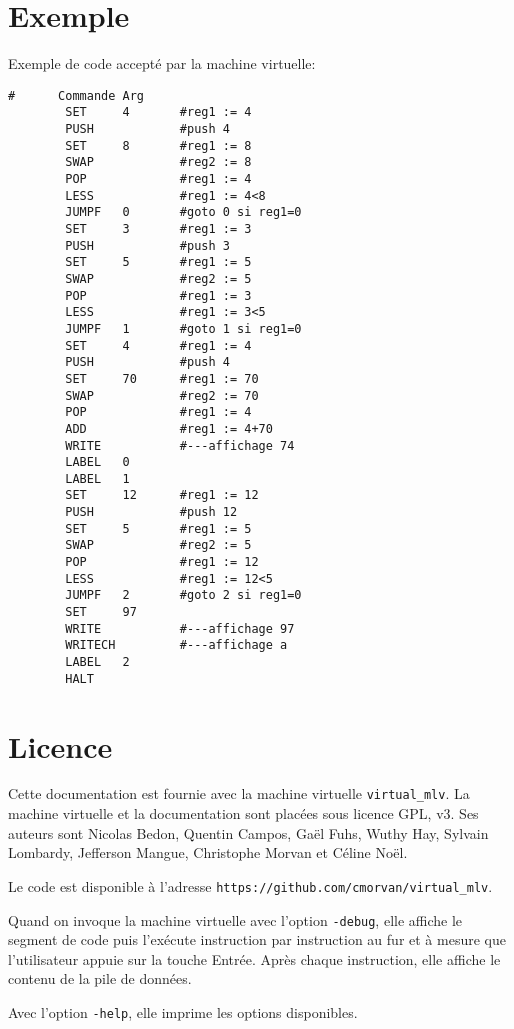 \documentclass[12pt,a4paper]{article}
\begin{document}
\section{Exemple}
Exemple de code accepté par la machine virtuelle:
\begin{verbatim}
#      Commande Arg
        SET     4       #reg1 := 4
        PUSH            #push 4
        SET     8       #reg1 := 8
        SWAP            #reg2 := 8
        POP             #reg1 := 4
        LESS            #reg1 := 4<8
        JUMPF   0       #goto 0 si reg1=0
        SET     3       #reg1 := 3
        PUSH            #push 3
        SET     5       #reg1 := 5
        SWAP            #reg2 := 5
        POP             #reg1 := 3
        LESS            #reg1 := 3<5
        JUMPF   1       #goto 1 si reg1=0
        SET     4       #reg1 := 4
        PUSH            #push 4
        SET     70      #reg1 := 70
        SWAP            #reg2 := 70
        POP             #reg1 := 4
        ADD             #reg1 := 4+70
        WRITE           #---affichage 74
        LABEL   0
        LABEL   1
        SET     12      #reg1 := 12
        PUSH            #push 12
        SET     5       #reg1 := 5
        SWAP            #reg2 := 5
        POP             #reg1 := 12 
        LESS            #reg1 := 12<5
        JUMPF   2       #goto 2 si reg1=0
        SET     97
        WRITE           #---affichage 97
        WRITECH         #---affichage a
        LABEL   2
        HALT
\end{verbatim}

\section{Licence}

Cette documentation est fournie avec la machine virtuelle
\texttt{virtual\_mlv}. La machine virtuelle et la documentation
sont placées sous licence GPL, v3. Ses auteurs sont Nicolas Bedon,
Quentin Campos, Gaël Fuhs, Wuthy Hay, Sylvain Lombardy, Jefferson
Mangue, Christophe Morvan et Céline Noël.

Le code est disponible à l'adresse \texttt{https://github.com/cmorvan/virtual\_mlv}.

Quand on invoque la machine virtuelle avec l'option \texttt{-debug}, elle affiche
le segment de code puis l'exécute instruction par instruction au fur et à mesure
que l'utilisateur appuie sur la touche Entrée. Après chaque instruction, elle
affiche le contenu de la pile de données.

Avec l'option  \texttt{-help}, elle imprime les options disponibles.
\end{document}
